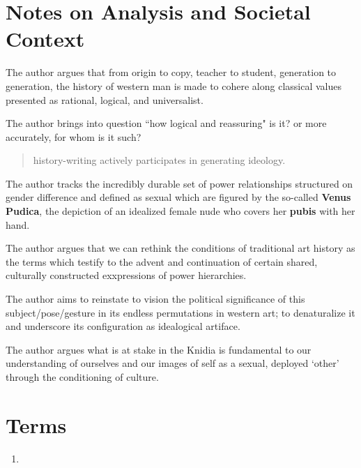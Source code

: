 \section{Notes on Analysis and Societal Context}
\label{sec:SocCont8}


\begin{nte}
    The author argues that from origin to copy, teacher to student, generation to generation, the history of western man is made to cohere along classical values presented as rational, logical, and universalist.
\end{nte}

The author brings into question ``how logical and reassuring" is it? or more accurately, for whom is it such?

\begin{quotation}
    history-writing actively participates in generating ideology.
\end{quotation}

The author tracks the incredibly durable set of power relationships structured on gender difference and defined as sexual which are figured by the so-called \textbf{Venus Pudica}, the depiction of an idealized female nude who covers her \textbf{pubis} with her hand.


The author argues that we can rethink the conditions of traditional art history as the terms which testify to the advent and continuation of certain shared, culturally constructed exxpressions of power hierarchies.

\begin{nte}
    The author aims to reinstate to vision the political significance of this subject/pose/gesture in its endless permutations in western art; to denaturalize it and underscore its configuration as idealogical artiface.
\end{nte}

The author argues what is at stake in the Knidia is fundamental to our understanding of ourselves and our images of self as a sexual, deployed `other' through the conditioning of culture.


\section{Terms}
\label{sec:terms8}

\begin{enumerate}
	\item
\end{enumerate}

%
%
%


